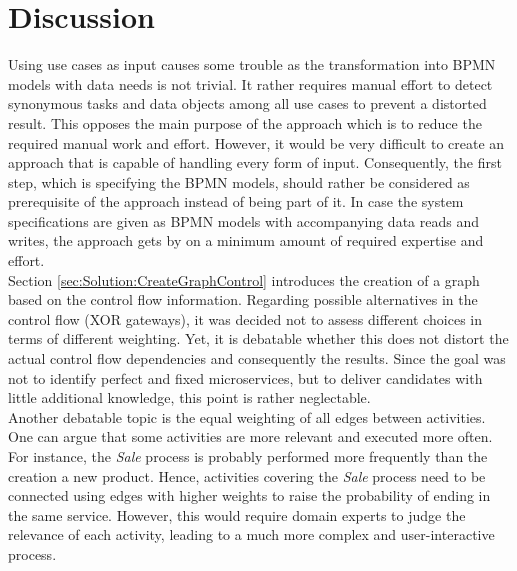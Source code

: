 \section{Discussion}
Using use cases as input causes some trouble as the transformation into BPMN models with data needs is not trivial. It rather requires manual effort to detect synonymous tasks and data objects among all use cases to prevent a distorted result. This opposes the main purpose of the approach which is to reduce the required manual work and effort. However, it would be very difficult to create an approach that is capable of handling every form of input. Consequently, the first step, which is specifying the BPMN models, should rather be considered as prerequisite of the approach instead of being part of it. In case the system specifications are given as BPMN models with accompanying data reads and writes, the approach gets by on a minimum amount of required expertise and effort. \\
Section \ref{sec:Solution:CreateGraphControl} introduces the creation of a graph based on the control flow information. Regarding possible alternatives in the control flow (XOR gateways), it was decided not to assess different choices in terms of different weighting. Yet, it is debatable whether this does not distort the actual control flow dependencies and consequently the results. Since the goal was not to identify perfect and fixed microservices, but to deliver candidates with little additional knowledge, this point is rather neglectable. \\
Another debatable topic is the equal weighting of all edges between activities. One can argue that some activities are more relevant and executed more often. For instance, the \textit{Sale} process is probably performed more frequently than the creation a new product. Hence, activities covering the \textit{Sale} process need to be connected using edges with higher weights to raise the probability of ending in the same service. However, this would require domain experts to judge the relevance of each activity, leading to a much more complex and user-interactive process. \\ 
